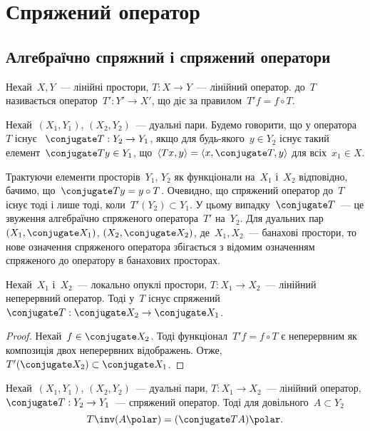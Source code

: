 \chapter{Спряжений оператор}

\section{Алгебраїчно спряжний і спряжений оператори}

\begin{definition}
    Нехай~$X, Y$~--- лінійні простори, $T: X \to Y$~--- лінійний оператор.  до~$T$ називається оператор~$T': Y' \to X'$, що діє за правилом~$T' f = f \circ T$.
\end{definition}

\begin{definition}
    Нехай~$(X_1, Y_1)$, $(X_2, Y_2)$~--- дуальні пари. Будемо говорити, що у оператора~$T$ існує ~$\conjugate T: Y_2 \to Y_1$, якщо для будь-якого~$y \in Y_2$ існує такий елемент~$\conjugate T y \in Y_1$, що~$\langle T x, y \rangle = \langle x, \conjugate T, y \rangle$ для всіх~$x_1 \in X$.
\end{definition}

Трактуючи елементи просторів~$Y_1$, $Y_2$ як функціонали на~$X_1$ і~$X_2$ відповідно, бачимо, що~$\conjugate T y = y \circ T$. Очевидно, що спряжений оператор до~$T$ існує тоді і лише тоді, коли~$T'(Y_2) \subset Y_1$. У цьому випадку~$\conjugate T$~--- це звуження алгебраїчно спряженого оператора~$T'$ на~$Y_2$. Для дуальних пар~$(X_1, \conjugate X_1)$, $(X_2, \conjugate X_2)$, де~$X_1, X_2$~--- банахові простори, то нове означення спряженого оператора збігається з відомим означенням спряженого до оператору в банахових просторах.

\begin{theorem}
    Нехай~$X_1$ і~$X_2$~--- локально опуклі простори, $T: X_1 \to X_2$~--- лінійний неперервний оператор. Тоді у~$T$ існує спряжений~$\conjugate T: \conjugate X_2 \to \conjugate X_1$.
\end{theorem}

\begin{proof}
    Нехай~$f \in \conjugate X_2$. Тоді функціонал~$T' f = f \circ T$ є неперервним як композиція двох неперервних відображень. Отже, $T'(\conjugate X_2) \subset \conjugate X_1$.
\end{proof}

\begin{theorem}
    Нехай~$(X_1, Y_1)$, $(X_2, Y_2)$~--- дуальні пари, $T: X_1 \to X_2$~--- лінійний оператор, $\conjugate T: Y_2 \to Y_1$~--- спряжений оператор. Тоді для довільного~$A \subset Y_2$
    \begin{equation*}
        T\inv(A\polar) = (\conjugate T A)\polar.
    \end{equation*}
\end{theorem}

